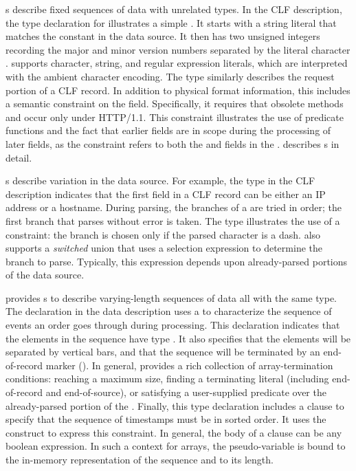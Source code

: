 s describe fixed sequences of data with unrelated types.
In the CLF description, the type declaration for 
illustrates a simple . It starts with a string literal
that matches the constant  in the data source.  It then has
two unsigned integers recording the major and minor version numbers
separated by the literal character .  \pads{} supports
character, string, and regular expression literals, which are
interpreted with the ambient character encoding. The type
 similarly describes the request portion of a CLF
record.  In addition to physical format information, this 
includes a semantic constraint on the  field.
Specifically, it requires that obsolete methods  and
 occur only under HTTP/1.1.  This constraint illustrates
the use of predicate functions and the fact that earlier fields are in
scope during the processing of later fields, as the constraint refers
to both the  and  fields in the .
 describes s in detail.

s describe variation in the data source.  For example, the
 type in the CLF description indicates that the first
field in a CLF record can be either an IP address or a hostname.
During parsing, the branches of a  are tried in order; the
first branch that parses without error is taken.  The 
type illustrates the use of a constraint: the branch 
is chosen only if the parsed character is a dash.  \pads{} also
supports a \textit{switched} union that uses a selection expression to
determine the branch to parse.  Typically, this expression depends
upon already-parsed portions of the data source.

\pads{} provides s to describe varying-length sequences of data all 
with the same type.  The  declaration in the \dibbler{} data description
uses a  to characterize the sequence of events an
order goes through during processing.  This declaration indicates that the elements
in the sequence have type .  It also specifies that the elements will
be separated by vertical bars, and that the sequence will be terminated by 
an end-of-record marker ().  In general, \pads{} provides a rich collection
of array-termination conditions: reaching a maximum size, finding a terminating
literal (including end-of-record and end-of-source),
or satisfying a user-supplied predicate over the already-parsed portion of 
the .  Finally, this type declaration includes a  clause
to specify that the sequence of timestamps must be in sorted order.
It uses the  construct to express this constraint.
In general, the body of a  clause can be any boolean expression.
In such a context for arrays, the pseudo-variable  is bound to the in-memory representation of the sequence and  to its length.

